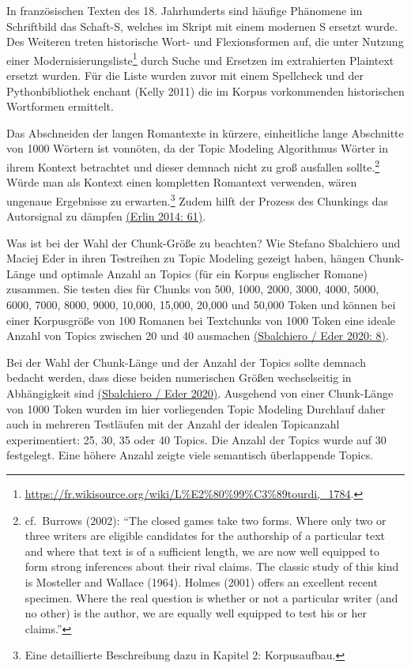 \documentclass[
  12pt,
  letterpaper,
  DIV=11,
  numbers=noendperiod]{scrreprt}
\begin{document}
In französischen Texten des 18. Jahrhunderts sind häufige Phänomene im
Schriftbild das Schaft-S, welches im Skript mit einem modernen S ersetzt
wurde. Des Weiteren treten historische Wort- und Flexionsformen auf, die
unter Nutzung einer Modernisierungsliste\footnote{\url{https://fr.wikisource.org/wiki/L\%E2\%80\%99\%C3\%89tourdi,_1784}.}
durch Suche und Ersetzen im extrahierten Plaintext ersetzt wurden. Für
die Liste wurden zuvor mit einem Spellcheck und der Pythonbibliothek
enchant (Kelly 2011) die im Korpus vorkommenden historischen Wortformen
ermittelt.

Das Abschneiden der langen Romantexte in kürzere, einheitliche lange
Abschnitte von 1000 Wörtern ist vonnöten, da der Topic Modeling
Algorithmus Wörter in ihrem Kontext betrachtet und dieser demnach nicht
zu groß ausfallen sollte.\footnote{cf.~Burrows (2002): ``The closed
  games take two forms. Where only two or three writers are eligible
  candidates for the authorship of a particular text and where that text
  is of a sufficient length, we are now well equipped to form strong
  inferences about their rival claims. The classic study of this kind is
  Mosteller and Wallace (1964). Holmes (2001) offers an excellent recent
  specimen. Where the real question is whether or not a particular
  writer (and no other) is the author, we are equally well equipped to
  test his or her claims.''} Würde man als Kontext einen kompletten
Romantext verwenden, wären ungenaue Ergebnisse zu erwarten.\footnote{Eine
  detaillierte Beschreibung dazu in Kapitel 2: Korpusaufbau.} Zudem
hilft der Prozess des Chunkings das Autorsignal zu dämpfen
\href{https://www.zotero.org/google-docs/?6Rogx3}{(Erlin 2014: 61)}.

Was ist bei der Wahl der Chunk-Größe zu beachten? Wie Stefano Sbalchiero
und Maciej Eder in ihren Testreihen zu Topic Modeling gezeigt haben,
hängen Chunk-Länge und optimale Anzahl an Topics (für ein Korpus
englischer Romane) zusammen. Sie testen dies für Chunks von 500, 1000,
2000, 3000, 4000, 5000, 6000, 7000, 8000, 9000, 10,000, 15,000, 20,000
und 50,000 Token und können bei einer Korpusgröße von 100 Romanen bei
Textchunks von 1000 Token eine ideale Anzahl von Topics zwischen 20 und
40 ausmachen
\href{https://www.zotero.org/google-docs/?tSfmvM}{(Sbalchiero / Eder
2020: 8)}.

Bei der Wahl der Chunk-Länge und der Anzahl der Topics sollte demnach
bedacht werden, dass diese beiden numerischen Größen wechselseitig in
Abhängigkeit sind
\href{https://www.zotero.org/google-docs/?NsovbI}{(Sbalchiero / Eder
2020)}. Ausgehend von einer Chunk-Länge von 1000 Token wurden im hier
vorliegenden Topic Modeling Durchlauf daher auch in mehreren Testläufen
mit der Anzahl der idealen Topicanzahl experimentiert: 25, 30, 35 oder
40 Topics. Die Anzahl der Topics wurde auf 30 festgelegt. Eine höhere
Anzahl zeigte viele semantisch überlappende Topics.
\end{document}
